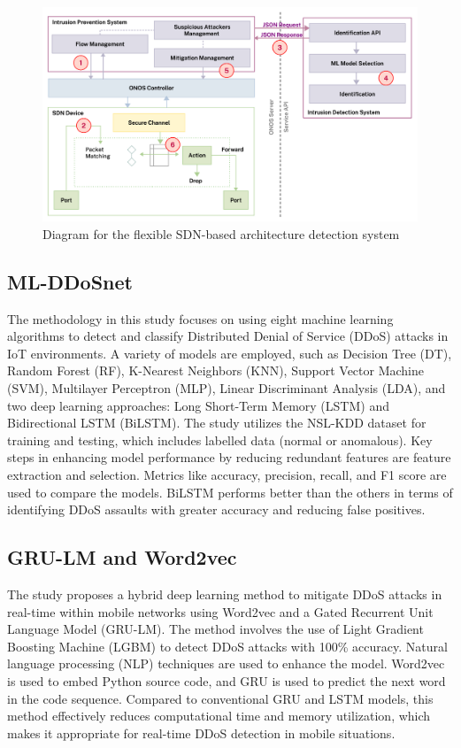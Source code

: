 \documentclass[a4paper, 12pt]{article}
\begin{document}
\begin{figure}[H]
    \centering
    \includegraphics[width=0.7\linewidth]{IMG_0250.jpeg}
    \caption{Diagram for the flexible SDN-based architecture detection system \protect{}}
    \label{fig:2}
\end{figure}

\subsection{ML-DDoSnet} 
The methodology in this study focuses on using eight machine learning algorithms to detect and classify Distributed Denial of Service (DDoS) attacks in IoT environments. A variety of models are employed, such as Decision Tree (DT), Random Forest (RF), K-Nearest Neighbors (KNN), Support Vector Machine (SVM), Multilayer Perceptron (MLP), Linear Discriminant Analysis (LDA), and two deep learning approaches: Long Short-Term Memory (LSTM) and Bidirectional LSTM (BiLSTM). The study utilizes the NSL-KDD dataset for training and testing, which includes labelled data (normal or anomalous). Key steps in enhancing model performance by reducing redundant features are feature extraction and selection. Metrics like accuracy, precision, recall, and F1 score are used to compare the models. BiLSTM performs better than the others in terms of identifying DDoS assaults with greater accuracy and reducing false positives. 

\subsection{GRU-LM and Word2vec}
The study proposes a hybrid deep learning method to mitigate DDoS attacks in real-time within mobile networks using Word2vec and a Gated Recurrent Unit Language Model (GRU-LM). The method involves the use of Light Gradient Boosting Machine (LGBM) to detect DDoS attacks with 100\% accuracy. Natural language processing (NLP) techniques are used to enhance the model. Word2vec is used to embed Python source code, and GRU is used to predict the next word in the code sequence. Compared to conventional GRU and LSTM models, this method effectively reduces computational time and memory utilization, which makes it appropriate for real-time DDoS detection in mobile situations. 
\end{document}

